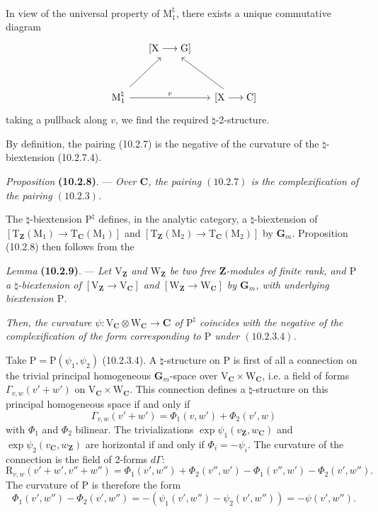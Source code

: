 \documentclass[11pt,leqno]{article}
\begin{document}
In view of the universal property of \(\mathrm{M}_1^{\natural}\),
there exists a unique commutative diagram
\[
\begin{tikzcd}[row sep=3em, column sep=1.5em]
& {[\mathrm{X}\longrightarrow\mathrm{G}]} &\\
\mathrm{M}_1^{\natural}
  \arrow[ur] \arrow[rr, "v"]
&& {[\mathrm{X}\longrightarrow\mathrm{C}]} \arrow[ul]
\end{tikzcd}
\]
taking a pullback along \(v\), we find the required
\(\natural\)-2-structure.

By definition, the pairing (10.2.7) is the negative of the
curvature of the \(\natural\)-biextension (10.2.7.4).

\textit{Proposition} \textbf{(10.2.8)}. — \textit{Over
\(\mathbf{C}\), the pairing \((10.2.7)\) is the complexification
of the pairing \((10.2.3)\).}

The \(\natural\)-biextension \(\mathrm{P}^{\natural}\) defines,
in the analytic category, a \(\natural\)-biextension of
\([\mathrm{T}_{\mathbf{Z}}(\mathrm{M}_1)\to
\mathrm{T}_{\mathbf{C}}(\mathrm{M}_1)]\) and
\([\mathrm{T}_{\mathbf{Z}}(\mathrm{M}_2)\to
\mathrm{T}_{\mathbf{C}}(\mathrm{M}_2)]\) by \(\mathbf{G}_m\).
Proposition (10.2.8) then follows from the

\textit{Lemma} \textbf{(10.2.9)}. — \textit{Let
\(\mathrm{V}_{\mathbf{Z}}\) and \(\mathrm{W}_{\mathbf{Z}}\)
be two free \(\mathbf{Z}\)-modules of finite rank, and \(\mathrm{P}\)
a \(\natural\)-biextension of
\([\mathrm{V}_{\mathbf{Z}}\to\mathrm{V}_{\mathbf{C}}]\) and
\([\mathrm{W}_{\mathbf{Z}}\to\mathrm{W}_{\mathbf{C}}]\) by
\(\mathbf{G}_m\), with underlying biextension \(\mathrm{P}\).}

\textit{Then, the curvature
\(\psi:\mathrm{V}_{\mathbf{C}}\otimes\mathrm{W}_{\mathbf{C}}
\to\mathbf{C}\) of \(\mathrm{P}^{\natural}\) coincides with
the negative of the complexification of the form corresponding to
\(\mathrm{P}\) under \((10.2.3.4)\).}

Take \(\mathrm{P}=\mathrm{P}(\psi_1,\psi_2)\) (10.2.3.4).
A \(\natural\)-structure on \(\mathrm{P}\) is first of all a
connection on the trivial principal homogeneous \(\mathbf{G}_m\)-space over
\(\mathrm{V}_{\mathbf{C}}\times\mathrm{W}_{\mathbf{C}}\),
i.e. a field of forms \(\Gamma_{v,w}(v'+w')\) on
\(\mathrm{V}_{\mathbf{C}}\times\mathrm{W}_{\mathbf{C}}\).
This connection defines a \(\natural\)-structure on this
principal homogeneous space if and only if
\[
\Gamma_{v,w}(v'+w')=\Phi_1(v,w')+\Phi_2(v',w)
\]
with \(\Phi_1\) and \(\Phi_2\) bilinear.
The trivializations \(\exp\psi_1(v_{\mathbf{Z}},w_{\mathbf{C}})\)
and \(\exp\psi_2(v_{\mathbf{C}},w_{\mathbf{Z}})\) are
horizontal if and only if \(\Phi_i=-\psi_i\).
The curvature of the connection is the field of 2-forms \(d\Gamma\):
\[
\mathrm{R}_{v,w}(v'+w',v''+w'')
=\Phi_1(v',w'')+\Phi_2(v'',w')
-\Phi_1(v'',w')-\Phi_2(v',w'').
\]
The curvature of \(\mathrm{P}\) is therefore the form
\[
\Phi_1(v',w'')-\Phi_2(v',w'')
=-(\psi_1(v',w'')-\psi_2(v',w''))
=-\psi(v',w'').
\]
\end{document}
